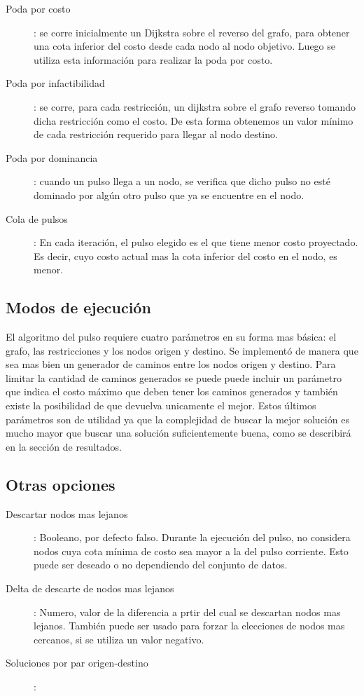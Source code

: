 \documentclass{article}
\begin{document}
  \begin{description}
    \item[Poda por costo]: {se corre inicialmente un Dijkstra sobre el reverso del grafo, para obtener una cota inferior del costo desde cada nodo al nodo objetivo. Luego se utiliza esta información para realizar la poda por costo.}
    \item[Poda por infactibilidad]: {se corre, para cada restricción, un dijkstra sobre el grafo reverso tomando dicha restricción como el costo. De esta forma obtenemos un valor mínimo de cada restricción requerido para llegar al nodo destino.}
    \item[Poda por dominancia]: {cuando un pulso llega a un nodo, se verifica que dicho pulso no esté dominado por algún otro pulso que ya se encuentre en el nodo.}
    \item[Cola de pulsos]: {En cada iteración, el pulso elegido es el que tiene menor costo proyectado. Es decir, cuyo costo actual mas la cota inferior del costo en el nodo, es menor.}
  \end{description}

  \subsection*{Modos de ejecución}

  El algoritmo del pulso requiere cuatro parámetros en su forma mas básica: el grafo, las restricciones y los nodos origen y destino. Se implementó de manera que sea mas bien un generador de caminos entre los nodos origen y destino. Para limitar la cantidad de caminos generados se puede puede incluir un parámetro que indica el costo máximo que deben tener los caminos generados y también existe la posibilidad de que devuelva unicamente el mejor. Estos últimos parámetros son de utilidad ya que la complejidad de buscar la mejor solución es mucho mayor que buscar una solución suficientemente buena, como se describirá en la sección de resultados.

  \subsection*{Otras opciones}

  \begin{description}
    \item[Descartar nodos mas lejanos]: Booleano, por defecto falso. Durante la ejecución del pulso, no considera nodos cuya cota mínima de costo sea mayor a la del pulso corriente. Esto puede ser deseado o no dependiendo del conjunto de datos.
    \item[Delta de descarte de nodos mas lejanos]: Numero, valor de la diferencia a prtir del cual se descartan nodos mas lejanos. También puede ser usado para forzar la elecciones de nodos mas cercanos, si se utiliza un valor negativo.
    \item[Soluciones por par origen-destino]: 
  \end{description}
\end{document}
